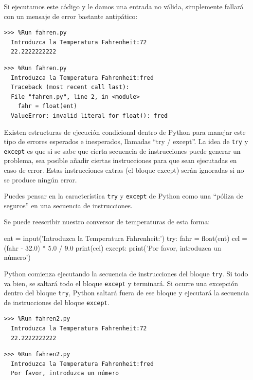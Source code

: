 Si ejecutamos este código y le damos una entrada no válida, simplemente
fallará con un mensaje de error bastante antipático:

\begin{Verbatim}[frame=single]
>>> %Run fahren.py
  Introduzca la Temperatura Fahrenheit:72
  22.2222222222
\end{Verbatim}

\begin{Verbatim}[frame=single]
>>> %Run fahren.py
  Introduzca la Temperatura Fahrenheit:fred
  Traceback (most recent call last):
  File "fahren.py", line 2, in <module>
    fahr = float(ent)
  ValueError: invalid literal for float(): fred
\end{Verbatim}

Existen estructuras de ejecución condicional dentro de Python para
manejar este tipo de errores esperados e inesperados, llamadas ``try /
except''. La idea de \texttt{try} y \texttt{except} es que si se sabe
que cierta secuencia de instrucciones puede generar un problema, sea
posible añadir ciertas instrucciones para que sean ejecutadas en caso de
error. Estas instrucciones extras (el bloque except) serán ignoradas si
no se produce ningún error.

Puedes pensar en la característica \texttt{try} y \texttt{except} de
Python como una ``póliza de seguros'' en una secuencia de instrucciones.

Se puede reescribir nuestro conversor de temperaturas de esta forma:

\begin{python}
ent = input('Introduzca la Temperatura Fahrenheit:')
try:
    fahr = float(ent)
    cel = (fahr - 32.0) * 5.0 / 9.0
    print(cel)
except:
    print('Por favor, introduzca un número')
\end{python}

Python comienza ejecutando la secuencia de instrucciones del bloque
\texttt{try}. Si todo va bien, se saltará todo el bloque \texttt{except}
y terminará. Si ocurre una excepción dentro del bloque \texttt{try},
Python saltará fuera de ese bloque y ejecutará la secuencia de
instrucciones del bloque \texttt{except}.

\begin{Verbatim}
>>> %Run fahren2.py
  Introduzca la Temperatura Fahrenheit:72
  22.2222222222
\end{Verbatim}

\begin{Verbatim}
>>> %Run fahren2.py
  Introduzca la Temperatura Fahrenheit:fred
  Por favor, introduzca un número
\end{Verbatim}

